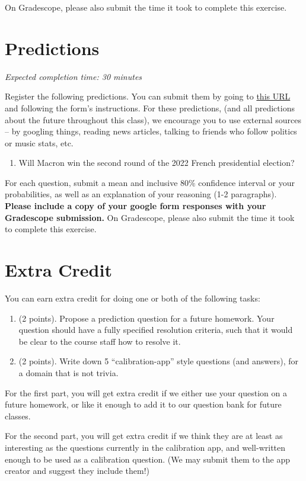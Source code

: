 \documentclass[11pt]{article}
\begin{document}
On Gradescope, please also submit the time it took to complete this exercise.

\section*{Predictions}

\emph{Expected completion time: 30 minutes}

Register the following predictions. You can submit them by going to \href{https://docs.google.com/forms/d/e/1FAIpQLSeMnjW4dLgLBFrIVr0n4-KjeakEj00KlN4PCfIRmHAvGj95kQ/viewform?usp=sf_link}{this URL} and following the form's instructions. For these predictions, (and all predictions about the future throughout this class), we encourage you to use external sources -- by googling things, reading news articles, talking to friends who follow politics or music stats, etc.

\begin{enumerate}
	\item Will Macron win the second round of the 2022 French presidential election?
\end{enumerate}

For each question, submit a mean and inclusive 80\% confidence interval or your probabilities, as well as an explanation of your reasoning (1-2 paragraphs). \textbf{Please include a copy of your google form responses with your Gradescope submission.} On Gradescope, please also submit the time it took to complete this exercise.

\section*{Extra Credit}

You can earn extra credit for doing one or both of the following tasks:
\begin{enumerate}
\item (2 points). Propose a prediction question for a future homework. Your question should have a fully specified resolution criteria, 
      such that it would be clear to the course staff how to resolve it.
\item (2 points). Write down 5 ``calibration-app'' style questions (and answers), for a domain that is not trivia.
\end{enumerate}

For the first part, you will get extra credit if we either use your question on a future homework, 
or like it enough to add it to our question bank for future classes.

For the second part, you will get extra credit if we think they are at least as interesting as the 
questions currently in the calibration app, and well-written enough to be used as a calibration question. 
(We may submit them to the app creator and suggest they include them!)
\end{document}
